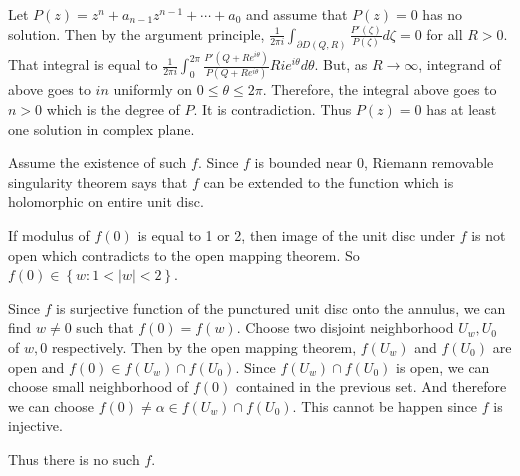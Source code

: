 \begin{problem}[5.1] \hfill

	Let $P(z) = z^n + a_{n-1}z^{n-1} + \cdots + a_0$ and assume that $P(z) =0$ has no solution. Then by the argument principle, $\frac{1}{2\pi i}\int_{\partial D(Q, R)}\frac{P'(\zeta)}{P(\zeta)}d\zeta = 0$ for all $R >0$. That integral is equal to $\frac{1}{2\pi i}\int_0^{2\pi}\frac{P'(Q+Re^{i\theta})}{P(Q+Re^{i\theta})}Rie^{i\theta}d\theta$.
	But, as $R \rightarrow \infty$, integrand of above goes to $in$ uniformly on $0 \leq \theta \leq 2\pi$. Therefore, the integral above goes to $n>0$ which is the degree of $P$. It is contradiction. Thus $P(z) = 0$ has at least one solution in complex plane.
\end{problem}

\begin{problem}[5.2] \hfill

	Assume the existence of such $f$. Since $f$ is bounded near $0$, Riemann removable singularity theorem says that $f$ can be extended to the function which is holomorphic on entire unit disc.

	If modulus of $f(0)$ is equal to 1 or 2, then image of the unit disc under $f$ is not open which contradicts to the open mapping theorem. So $f(0) \in \left\{ w: 1 < |w| < 2 \right\}$.

	Since $f$ is surjective function of the punctured unit disc onto the annulus, we can find $w \ne 0$ such that $f(0) = f(w)$.
	Choose two disjoint neighborhood $U_w, U_0$ of $w, 0$ respectively. Then by the open mapping theorem, $f(U_w)$ and $f(U_0)$ are open and $f(0) \in f(U_w) \cap f(U_0)$.
	Since $f(U_w) \cap f(U_0)$ is open, we can choose small neighborhood of $f(0)$ contained in the previous set.
	And therefore we can choose $f(0) \ne \alpha \in f(U_w) \cap f(U_0)$. This cannot be happen since $f$ is injective.

	Thus there is no such $f$.
	
\end{problem}


